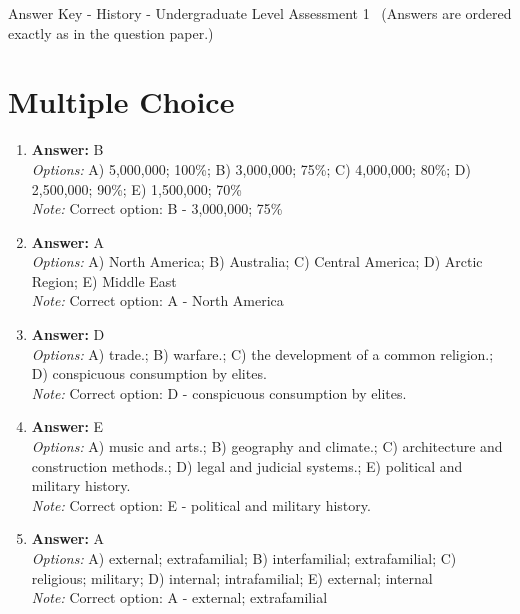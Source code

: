 \documentclass[12pt]{article}
\begin{document}
\begin{center}
Answer Key - History - Undergraduate Level Assessment 1 \
\small (Answers are ordered exactly as in the question paper.)
\end{center}

\section*{Multiple Choice}
\begin{enumerate}[label=\arabic*.]
\item \textbf{Answer:} B
\\ \textit{Options:} A) 5,000,000; 100\%; B) 3,000,000; 75\%; C) 4,000,000; 80\%; D) 2,500,000; 90\%; E) 1,500,000; 70\%
\\ \textit{Note:} Correct option: B - 3,000,000; 75\%
\item \textbf{Answer:} A
\\ \textit{Options:} A) North America; B) Australia; C) Central America; D) Arctic Region; E) Middle East
\\ \textit{Note:} Correct option: A - North America
\item \textbf{Answer:} D
\\ \textit{Options:} A) trade.; B) warfare.; C) the development of a common religion.; D) conspicuous consumption by elites.
\\ \textit{Note:} Correct option: D - conspicuous consumption by elites.
\item \textbf{Answer:} E
\\ \textit{Options:} A) music and arts.; B) geography and climate.; C) architecture and construction methods.; D) legal and judicial systems.; E) political and military history.
\\ \textit{Note:} Correct option: E - political and military history.
\item \textbf{Answer:} A
\\ \textit{Options:} A) external; extrafamilial; B) interfamilial; extrafamilial; C) religious; military; D) internal; intrafamilial; E) external; internal
\\ \textit{Note:} Correct option: A - external; extrafamilial
\end{enumerate}
\end{document}
